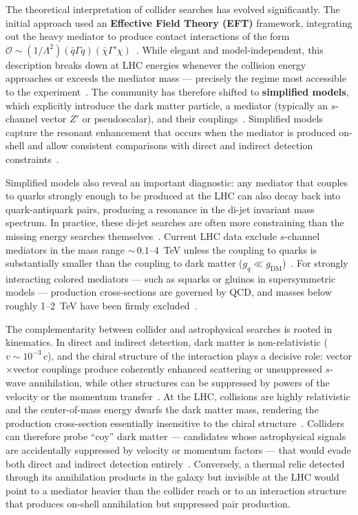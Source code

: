 The theoretical interpretation of collider searches has evolved significantly.
The initial approach used an \textbf{Effective Field Theory (EFT)} framework, integrating out the heavy mediator to produce contact interactions of the form $\mathcal{O} \sim (1/\Lambda^2)(\bar{q}\Gamma q)(\bar{\chi}\Gamma'\chi)$~\cite{Cirelli:2024ssz}.
While elegant and model-independent, this description breaks down at LHC energies whenever the collision energy approaches or exceeds the mediator mass --- precisely the regime most accessible to the experiment~\cite{Cirelli:2024ssz}.
The community has therefore shifted to \textbf{simplified models}, which explicitly introduce the dark matter particle, a mediator (typically an $s$-channel vector $Z'$ or pseudoscalar), and their couplings~\cite{Boveia:2018yeb,Cirelli:2024ssz}.
Simplified models capture the resonant enhancement that occurs when the mediator is produced on-shell and allow consistent comparisons with direct and indirect detection constraints~\cite{Boveia:2018yeb}.

Simplified models also reveal an important diagnostic: any mediator that couples to quarks strongly enough to be produced at the LHC can also decay back into quark-antiquark pairs, producing a resonance in the di-jet invariant mass spectrum.
In practice, these di-jet searches are often more constraining than the missing energy searches themselves~\cite{Cirelli:2024ssz}.
Current LHC data exclude $s$-channel mediators in the mass range ${\sim}\,0.1$--$4$~TeV unless the coupling to quarks is substantially smaller than the coupling to dark matter ($g_q \ll g_\text{DM}$)~\cite{Cirelli:2024ssz}.
For strongly interacting colored mediators --- such as squarks or gluinos in supersymmetric models --- production cross-sections are governed by QCD, and masses below roughly 1--2~TeV have been firmly excluded~\cite{Cirelli:2024ssz,Hooper:2024}.

The complementarity between collider and astrophysical searches is rooted in kinematics.
In direct and indirect detection, dark matter is non-relativistic ($v \sim 10^{-3}\,c$), and the chiral structure of the interaction plays a decisive role: vector$\times$vector couplings produce coherently enhanced scattering or unsuppressed $s$-wave annihilation, while other structures can be suppressed by powers of the velocity or the momentum transfer~\cite{Cirelli:2024ssz}.
At the LHC, collisions are highly relativistic and the center-of-mass energy dwarfs the dark matter mass, rendering the production cross-section essentially insensitive to the chiral structure~\cite{Cirelli:2024ssz}.
Colliders can therefore probe ``coy'' dark matter --- candidates whose astrophysical signals are accidentally suppressed by velocity or momentum factors --- that would evade both direct and indirect detection entirely~\cite{Cirelli:2024ssz}.
Conversely, a thermal relic detected through its annihilation products in the galaxy but invisible at the LHC would point to a mediator heavier than the collider reach or to an interaction structure that produces on-shell annihilation but suppressed pair production.

